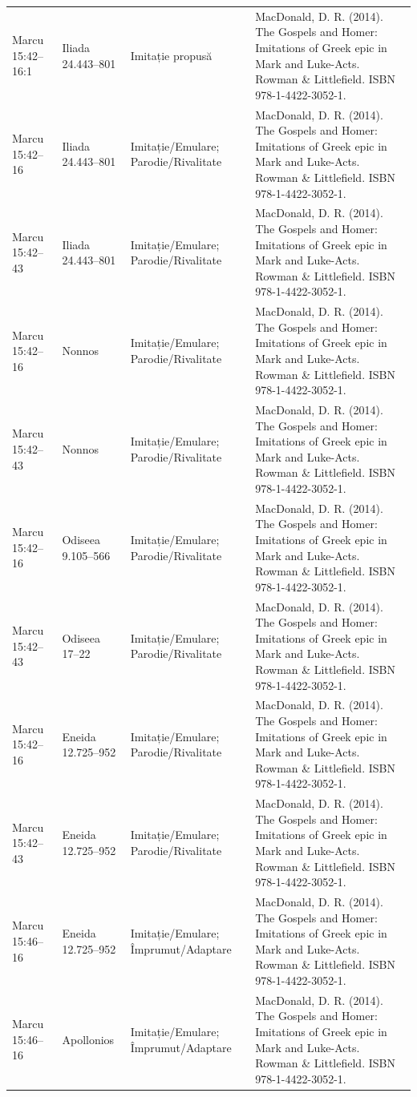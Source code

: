\documentclass[12pt,a4paper,twoside,openany]{book}
\begin{document}
\begin{longtable}{L{1.4cm}L{1.7cm}L{3.1cm}L{8.4cm}}
Marcu 15:42–16:1 & Iliada 24.443–801 & Imitație propusă & MacDonald, D. R. (2014). The Gospels and Homer: Imitations of Greek epic in Mark and Luke-Acts. Rowman \& Littlefield. ISBN 978-1-4422-3052-1. \\
Marcu 15:42–16 & Iliada 24.443–801 & Imitație/Emulare; Parodie/Rivalitate & MacDonald, D. R. (2014). The Gospels and Homer: Imitations of Greek epic in Mark and Luke-Acts. Rowman \& Littlefield. ISBN 978-1-4422-3052-1. \\
Marcu 15:42–43 & Iliada 24.443–801 & Imitație/Emulare; Parodie/Rivalitate & MacDonald, D. R. (2014). The Gospels and Homer: Imitations of Greek epic in Mark and Luke-Acts. Rowman \& Littlefield. ISBN 978-1-4422-3052-1. \\
Marcu 15:42–16 & Nonnos & Imitație/Emulare; Parodie/Rivalitate & MacDonald, D. R. (2014). The Gospels and Homer: Imitations of Greek epic in Mark and Luke-Acts. Rowman \& Littlefield. ISBN 978-1-4422-3052-1. \\
Marcu 15:42–43 & Nonnos & Imitație/Emulare; Parodie/Rivalitate & MacDonald, D. R. (2014). The Gospels and Homer: Imitations of Greek epic in Mark and Luke-Acts. Rowman \& Littlefield. ISBN 978-1-4422-3052-1. \\
Marcu 15:42–16 & Odiseea 9.105–566 & Imitație/Emulare; Parodie/Rivalitate & MacDonald, D. R. (2014). The Gospels and Homer: Imitations of Greek epic in Mark and Luke-Acts. Rowman \& Littlefield. ISBN 978-1-4422-3052-1. \\
Marcu 15:42–43 & Odiseea 17–22 & Imitație/Emulare; Parodie/Rivalitate & MacDonald, D. R. (2014). The Gospels and Homer: Imitations of Greek epic in Mark and Luke-Acts. Rowman \& Littlefield. ISBN 978-1-4422-3052-1. \\
Marcu 15:42–16 & Eneida 12.725–952 & Imitație/Emulare; Parodie/Rivalitate & MacDonald, D. R. (2014). The Gospels and Homer: Imitations of Greek epic in Mark and Luke-Acts. Rowman \& Littlefield. ISBN 978-1-4422-3052-1. \\
Marcu 15:42–43 & Eneida 12.725–952 & Imitație/Emulare; Parodie/Rivalitate & MacDonald, D. R. (2014). The Gospels and Homer: Imitations of Greek epic in Mark and Luke-Acts. Rowman \& Littlefield. ISBN 978-1-4422-3052-1. \\
Marcu 15:46–16 & Eneida 12.725–952 & Imitație/Emulare; Împrumut/Adaptare & MacDonald, D. R. (2014). The Gospels and Homer: Imitations of Greek epic in Mark and Luke-Acts. Rowman \& Littlefield. ISBN 978-1-4422-3052-1. \\
Marcu 15:46–16 & Apollonios & Imitație/Emulare; Împrumut/Adaptare & MacDonald, D. R. (2014). The Gospels and Homer: Imitations of Greek epic in Mark and Luke-Acts. Rowman \& Littlefield. ISBN 978-1-4422-3052-1. \\

\end{longtable}
\end{document}
